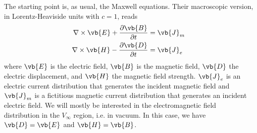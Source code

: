 \documentclass[11pt,SymmetricalJury]{inrsthesis/inrsthesis}
\begin{document}
The starting point is, as usual, the Maxwell equations. Their macroscopic version,
in Lorentz-Heaviside units with $c=1$, reads
  \begin{subequations}
  \begin{align}
    \nabla\times\vb{E} + \frac{\partial\vb{B}}{\partial t}  &= \vb{J}_m \\
    \nabla\times\vb{H} - \frac{\partial\vb{D}}{\partial t}  &= \vb{J}_e
  \end{align}
  \end{subequations}
where $\vb{E}$ is the electric field, $\vb{B}$ is the magnetic field,
$\vb{D}$ the electric displacement, and $\vb{H}$ the magnetic field strength.
$\vb{J}_e$ is an electric current distribution that generates the incident
magnetic field and $\vb{J}_m$ is a fictitious magnetic current distribution
that generates an incident electric field. We will mostly be interested
in the electromagnetic field distribution in the $V_\infty$ region, i.e.
in vacuum. In this case, we have $\vb{D}=\vb{E}$ and $\vb{H}=\vb{B}$.
\end{document}
